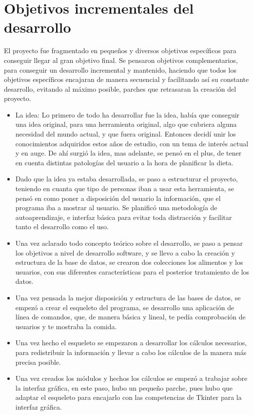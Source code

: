\section{Objetivos incrementales del desarrollo}
El proyecto fue fragmentado en pequeños y diversos objetivos específicos para conseguir llegar al gran objetivo final. Se pensaron objetivos complementarios, para conseguir un desarrollo incremental y mantenido, haciendo que todos los objetivos específicos encajaran de manera secuencial y facilitando así su constante desarrollo, evitando al máximo posible, parches que retrasaran la creación del proyecto.
\begin{itemize}
\item La idea: Lo primero de todo ha desarrollar fue la idea, había que conseguir una idea original, para una herramienta original, algo que cubriera alguna necesidad del mundo actual, y que fuera original. Entonces decidí unir los conocimientos adquiridos estos años de estudio, con un tema de interés actual y en auge. De ahí surgió la idea, mas adelante, se pensó en el plus, de tener en cuenta distintas patologías del usuario a la hora de planificar la dieta.
\item Dado que la idea ya estaba desarrollada, se paso a estructurar el proyecto, teniendo en cuanta que tipo de personas iban a usar esta herramienta, se pensó en como poner a disposición del usuario la información, que el programa iba a mostrar al usuario. Se planificó una metodología de autoaprendizaje, e interfaz básica para evitar toda distracción y facilitar tanto el desarrollo como el uso.
\item Una vez aclarado todo concepto teórico sobre el desarrollo, se paso a pensar los objetivos a nivel de desarrollo software, y se llevo a cabo la creación y estructura de la base de datos, se crearon dos colecciones los alimentos y los usuarios, con sus diferentes características para el posterior tratamiento de los datos.
\item Una vez pensada la mejor disposición y estructura de las bases de datos, se empezó a crear el esqueleto del programa, se desarrollo una aplicación de línea de comandos, que, de manera básica y lineal, te pedía comprobación de usuarios y te mostraba la comida.
\item	Una vez hecho el esqueleto se empezaron a desarrollar los cálculos necesarios, para redistribuir la información y llevar a cabo los cálculos de la manera más precisa posible.
\item	Una vez creados los módulos y hechos los cálculos se empezó a trabajar sobre la interfaz gráfica, en este paso, hubo un pequeño parche, pues hubo que adaptar el esqueleto para encajarlo con las competencias de Tkinter para la interfaz gráfica.

\end{itemize}
